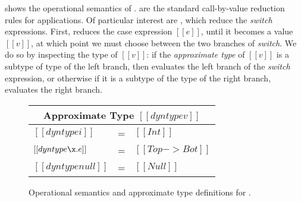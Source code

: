  shows the operational semantics of \name.
 are the standard call-by-value reduction
rules
for applications.
Of particular interest are
, which reduce
the \emph{switch} expressions.
First,
 reduces the case expression $[[e]]$,
until it becomes a value $[[v]]$, at which point
we must choose between the two branches of \emph{switch}.
We do so by inspecting the type of $[[v]]$:
if the \textit{approximate type} of $[[v]]$ is
a subtype of type of the left branch,
then  evaluates
the left branch of the \emph{switch} expression,
or otherwise if it is a subtype of the type of the right branch,
 evaluates the right branch.



\begin{figure}[t]
  \begin{small}
    \centering
  \end{small}
  \begin{center}

  {\renewcommand{\arraystretch}{1.2}
    \begin{tabular}{|lcl|}
      \multicolumn{3}{c}{Approximate Type $[[dyntype v]]$} \\
      \hline
      $[[dyntype i]]$ & = & $[[Int]]$ \\
      $[[dyntype \x.e]]$ & = & $[[Top -> Bot]]$ \\
      $[[dyntype null]]$ & = & $[[Null]]$ \\
      \hline
    \end{tabular} }
    \end{center}
  \caption{Operational semantics and approximate type definitions for \name.}
  \label{fig:union:os}
\end{figure}

